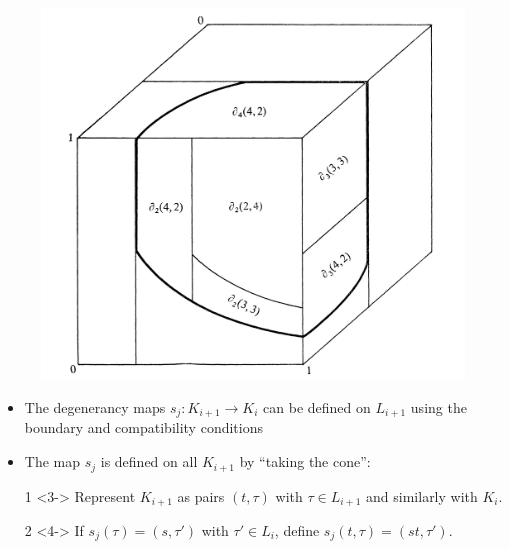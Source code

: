 \documentclass{beamer}
\theoremstyle{definition}
\begin{document}
\begin{frame}
\begin{figure}
\includegraphics[scale=0.15]{k5}
\end{figure}
\end{frame}
\begin{frame}
\begin{itemize}
\item<1-> The degenerancy maps $s_j:K_{i+1}\to K_i$ can be defined on $L_{i+1}$ using the boundary and compatibility conditions
\item<2->The map $s_j$ is defined on all $K_{i+1}$ by ``taking the cone'':
\item[1]<3-> Represent $K_{i+1}$ as pairs $(t,\tau)$ with $\tau\in L_{i+1}$ and similarly with $K_i$.
\item[2]<4-> If $s_j(\tau)=(s,\tau')$ with $\tau'\in L_i$, define $s_j(t,\tau)=(st,\tau')$. %
\end{itemize}
\end{frame}
\end{document}

